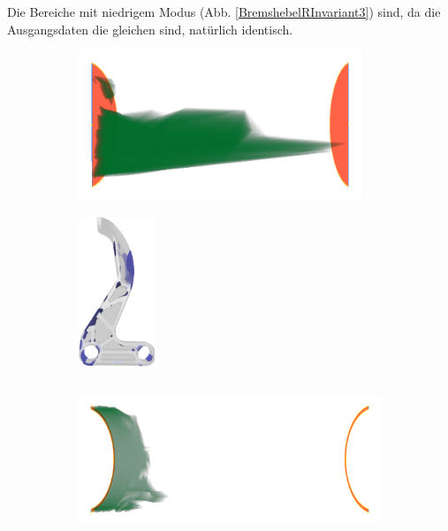 \documentclass[a4paper,fontsize=12pt,toc=bib,halfparskip]{scrartcl}
\begin{document}
Die Bereiche mit niedrigem Modus (Abb. \ref{BremshebelRInvariant3}) sind, da die Ausgangsdaten die gleichen sind, nat\"urlich identisch.

\begin{figure}
	\begin{subfigure}{0.49\textwidth}
		\centering
		\includegraphics[height=4.5cm]{pictures/results/Bremshebel_R_InvariantSpace1.png}
		\subcaption{}
		\label{BremshebelRInvariant1}
	\end{subfigure}
	\hspace*{\fill}
	\begin{subfigure}{0.49\textwidth}
		\centering
		\includegraphics[height=4.5cm]{pictures/results/Bremshebel_R_Object1.png}
		\subcaption{}
		\label{BremshebelRObject1}
	\end{subfigure}
	\medskip
	\begin{subfigure}{0.49\textwidth}
		\centering
		\includegraphics[height=4.5cm]{pictures/results/Bremshebel_R_InvariantSpace2.png}
		\subcaption{}
		\label{BremshebelRInvariant2}
	\end{subfigure}
	\hspace*{\fill}
	\begin{subfigure}{0.49\textwidth}

\end{subfigure}
\end{figure}
\end{document}
